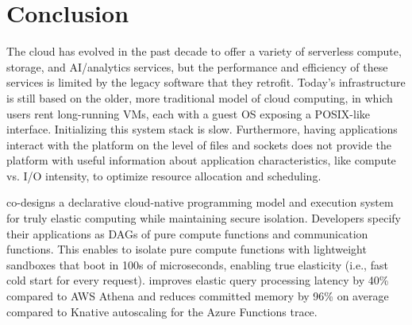 \section{Conclusion}\label{sec:conclusion}

The cloud has evolved in the past decade to offer a variety of serverless compute, storage, and AI/analytics services, but the performance and efficiency of these services is limited by the legacy software that they retrofit. Today's infrastructure is still based on the older, more traditional model of cloud computing, in which users rent long-running VMs, each with a guest OS exposing a POSIX-like interface. Initializing this system stack is slow. Furthermore, having applications interact with the platform on the level of files and sockets does not provide the platform with useful information about application characteristics, like compute vs. I/O intensity, to optimize resource allocation and scheduling.

\dandelion co-designs a declarative cloud-native programming model and execution system for truly elastic computing while maintaining secure isolation. %
Developers specify their applications as DAGs of pure compute functions and communication functions.
This enables \dandelion to isolate pure compute functions with lightweight sandboxes that boot in 100s of microseconds, enabling true elasticity (i.e., fast cold start for every request). \dandelion improves elastic query processing latency by 40\% compared to AWS Athena and reduces committed memory by 96\% on average compared to Knative autoscaling for the Azure Functions trace.



    
